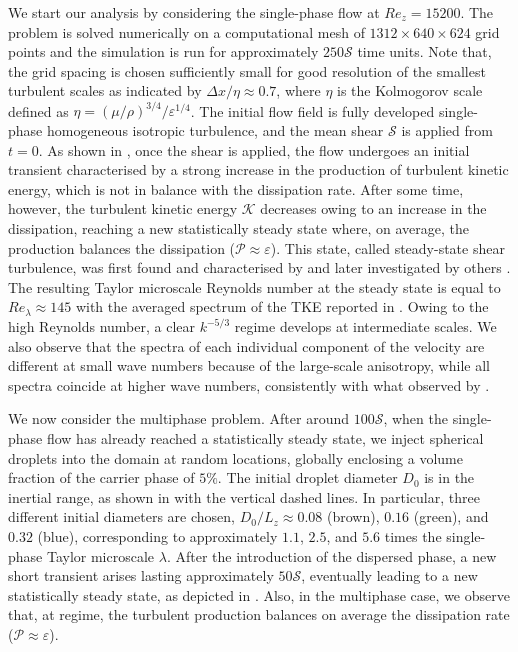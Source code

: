 We start our analysis by considering the single-phase flow at $Re_z = 15200$. The problem is solved numerically on a computational mesh of $1312 \times 640 \times 624$ grid points and the simulation is run for approximately $250\mathcal{S}$ time units. Note that, the grid spacing is chosen sufficiently small for good resolution of the smallest turbulent scales as indicated by $\Delta x / \eta \approx 0.7$, where $\eta$ is the Kolmogorov scale defined as $\eta=\left( \mu/\rho \right)^{3/4}/\varepsilon^{1/4}$. The initial flow field is  fully developed single-phase homogeneous isotropic turbulence, and the mean shear $\mathcal{S}$ is applied from $t=0$. As shown in , once the shear is applied, the flow undergoes an initial transient characterised by a strong increase in the production of turbulent kinetic energy, which is not in balance with the dissipation rate. After some time, however, the turbulent kinetic energy $\mathcal{K}$ decreases owing to an increase in the dissipation, reaching a new statistically steady state where, on average, the production balances the dissipation ($\mathcal{P} \approx \varepsilon$). This state, called steady-state shear turbulence, was first found and characterised by \cite{pumir_1996a} and later investigated by others \citep[e.g.][]{sekimoto_dong_jimenez_2016a}. The resulting Taylor microscale Reynolds number at the steady state is equal to $Re_\lambda \approx 145$ with the averaged spectrum of the TKE reported in . Owing to the high Reynolds number, a clear $k^{-5/3}$ regime develops at intermediate scales. We also observe that the spectra of each individual component of the velocity are different at small wave numbers because of the large-scale anisotropy, while all spectra coincide at higher wave numbers, consistently with what observed by \cite{pumir_1996a}.

We now consider the multiphase problem. After around $100 \mathcal{S}$, when the single-phase flow has already reached a statistically steady state, we inject spherical droplets into the domain at random locations, globally enclosing a volume fraction of the carrier phase of $5\%$. The initial droplet diameter $D_0$ is in the inertial range, as shown in  with the vertical dashed lines. In particular, three different initial diameters are chosen, $D_0/L_z \approx 0.08$ (brown), $0.16$ (green), and $0.32$ (blue), corresponding to approximately $1.1$, $2.5$, and $5.6$ times the single-phase Taylor microscale $\lambda$. After the introduction of the dispersed phase, a new short transient arises lasting approximately $50\mathcal{S}$, eventually leading to a new statistically steady state, as depicted in . Also, in the multiphase case, we observe that, at regime, the turbulent production balances on average the dissipation rate ($\mathcal{P} \approx \varepsilon$).

